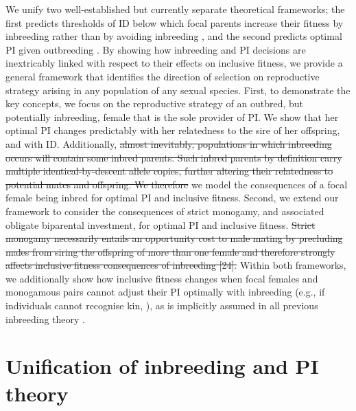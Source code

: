 \documentclass[12pt]{article}
\begin{document}
We unify two well-established but currently separate theoretical frameworks; the first predicts thresholds of ID below which focal parents increase their fitness by inbreeding rather than by avoiding inbreeding \cite[][]{Parker1979}, and the second predicts optimal PI given outbreeding \cite[][]{Macnair1978}. By showing how inbreeding and PI decisions are inextricably linked with respect to their effects on inclusive fitness, we provide a general framework that identifies the direction of selection on reproductive strategy arising in any population of any sexual species. First, to demonstrate the key concepts, we focus on the reproductive strategy of an outbred, but potentially inbreeding, female that is the sole provider of PI. We show that her optimal PI changes predictably with her relatedness to the sire of her offspring, and with ID. Additionally, {\color{red}\st{almost inevitably, populations in which inbreeding occurs will contain some inbred parents. Such inbred parents by definition carry multiple identical-by-descent allele copies, further altering their relatedness to potential mates and offspring. We therefore}} {\color{blue}we} model the consequences of a focal female being inbred for optimal PI and inclusive fitness. Second, we extend our framework to consider the consequences of strict monogamy, and associated obligate biparental investment, for optimal PI and inclusive fitness. {\color{red}\st{Strict monogamy necessarily entails an opportunity cost to male mating by precluding males from siring the offspring of more than one female and therefore strongly affects inclusive fitness consequences of inbreeding [24].}} Within both frameworks, we additionally show how inclusive fitness changes when focal females and monogamous pairs cannot adjust their PI optimally with inbreeding (e.g., if individuals cannot recognise kin, \cite[][]{Penn2010}), as is implicitly assumed in all previous inbreeding theory \cite[][]{Parker1979, Parker2006, Waser1986, Kokko2006, Duthie2015a}.

\section*{Unification of inbreeding and PI theory}
\end{document}
